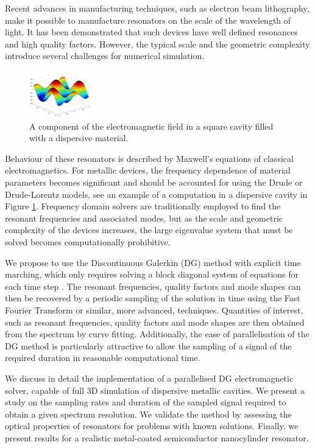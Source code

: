 \documentclass[times,11pt]{ACME2015article}
\begin{document}
\begin{normalsize}
Recent advances in manufacturing techniques, such as electron beam lithography, make it possible to manufacture resonators on the scale of the wavelength of light. It has been demonstrated that such devices have well defined resonances and high quality factors. However, the typical scale and the geometric complexity introduce several challenges for numerical simulation.

\begin{figure}
 \centering
 \includegraphics[width=0.25\textwidth]{DispersiveCavityPlot}
 \caption{A component of the electromagnetic field in a square cavity filled with a dispersive material.}
 \label{MicroToroidalSensor:graph}
\end{figure}

Behaviour of these resonators is described by Maxwell's equations of classical electromagnetics. For metallic devices, the frequency dependence of material parameters becomes significant and should be accounted for using the Drude or Drude-Lorentz models, see an example of a computation in a dispersive cavity in Figure \ref{MicroToroidalSensor:graph}. Frequency domain solvers \cite{ref1} are traditionally employed to find the resonant frequencies and associated modes, but as the scale and geometric complexity of the devices increases, the large eigenvalue system that must be solved becomes computationally prohibitive.

We propose to use the Discontinuous Galerkin (DG) method with explicit time marching, which only requires solving a block diagonal system of equations for each time step \cite{ref2}. The resonant frequencies, quality factors and mode shapes can then be recovered by a periodic sampling of the solution in time using the Fast Fourier Transform or similar, more advanced, techniques. Quantities of interest, such as resonant frequencies, quality factors and mode shapes are then obtained from the spectrum by curve fitting. Additionally, the ease of parallelisation of the DG method is particularly attractive to allow the sampling of a signal of the required duration in reasonable computational time.

We discuss in detail the implementation of a parallelised DG electromagnetic solver, capable of full 3D simulation of dispersive metallic cavities. We present a study on the sampling rates and duration of the sampled signal required to obtain a given spectrum resolution. We validate the method by assessing the optical properties of resonators for problems with known solutions. Finally, we present results for a realistic metal-coated semiconductor nanocylinder resonator.

\end{normalsize}
\end{document}
